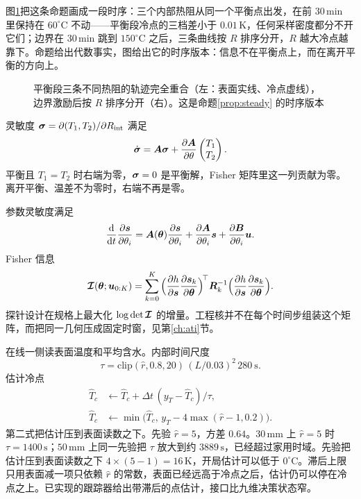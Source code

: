 图\ref{fig:inobserv}{}把这条命题画成一段时序：三个内部热阻从同一个平衡点出发，在前 \(30\,\mathrm{min}\) 里保持在 \(60^\circ\mathrm{C}\) 不动——平衡段冷点的三档差小于 \(0.01\,\mathrm{K}\)，任何采样密度都分不开它们；边界在 \(30\,\mathrm{min}\) 跳到 \(150^\circ\mathrm{C}\) 之后，三条曲线按 \(R\) 排序分开，\(R\) 越大冷点越靠下。命题给出代数事实，图给出它的时序版本：信息不在平衡点上，而在离开平衡的方向上。

\begin{figure}[t]
\centering
{}
\caption{平衡段三条不同热阻的轨迹完全重合（左：表面实线、冷点虚线），边界激励后按 \(R\) 排序分开（右）。这是命题\ref{prop:steady} 的时序版本}
\label{fig:inobserv}
\end{figure}

灵敏度 \(\bm{\sigma}=\partial(T_1,T_2)/\partial R_{\mathrm{int}}\) 满足
\begin{equation}
\label{eq:sigma}
\dot{\bm{\sigma}}=\bm{A}\bm{\sigma}+\frac{\partial\bm{A}}{\partial\theta}\begin{pmatrix}T_1\\ T_2\end{pmatrix}.
\end{equation}
平衡且 \(T_1=T_2\) 时右端为零，\(\bm{\sigma}=0\) 是平衡解，Fisher 矩阵里这一列贡献为零。离开平衡、温差不为零时，右端不再是零。

参数灵敏度满足
\begin{equation}
\label{eq:sens}
\frac{\mathrm{d}}{\mathrm{d}t}\frac{\partial \bm{s}}{\partial\theta_i}
=\bm{A}(\bm{\theta})\frac{\partial \bm{s}}{\partial\theta_i}
+\frac{\partial\bm{A}}{\partial\theta_i}\bm{s}
+\frac{\partial\bm{B}}{\partial\theta_i}\bm{u}.
\end{equation}
Fisher 信息
\begin{equation}
\label{eq:fisher}
\bm{\mathcal{I}}(\bm{\theta};\bm{u}_{0:K})
=\sum_{k=0}^{K}
\Big(\frac{\partial h}{\partial \bm{s}}\frac{\partial \bm{s}_k}{\partial\bm{\theta}}\Big)^{\!\top}
\bm{R}_k^{-1}
\Big(\frac{\partial h}{\partial \bm{s}}\frac{\partial \bm{s}_k}{\partial\bm{\theta}}\Big).
\end{equation}
探针设计在规格上最大化 \(\log\det\bm{\mathcal{I}}\) 的增量。工程核并不在每个时间步组装这个矩阵，而把同一几何压成固定时窗，见第\ref{ch:ati}{}节。

在线一侧读表面温度和平均含水。内部时间尺度
\[
\tau=\mathrm{clip}(\hat r,0.8,20)\,(L/0.03)^2\,280\ \mathrm{s}.
\]
估计冷点
\begin{align}
\hat T_c &\leftarrow \hat T_c+\Delta t\,(y_T-\hat T_c)/\tau,\\
\hat T_c &\leftarrow \min\big(\hat T_c,\, y_T-4\max(\hat r-1,0.2)\big).
\end{align}
第二式把估计压到表面读数之下。先验 \(\hat r=5\)，方差 \(0.64\)。\(30\,\mathrm{mm}\) 上 \(\hat r=5\) 时 \(\tau=1400\,\mathrm{s}\)；\(50\,\mathrm{mm}\) 上同一先验把 \(\tau\) 放大到约 \(3889\,\mathrm{s}\)，已经超过家用时域。先验把估计压到表面读数之下 \(4\times(5-1)=16\,\mathrm{K}\)，开局估计可以低于 \(0^\circ\mathrm{C}\)。滞后上限只用表面减一项只依赖 \(\hat r\) 的常数，表面已经远高于冷点之后，估计仍可以停在冷点之上。已实现的跟踪器给出带滞后的点估计，接口比九维决策状态窄。

